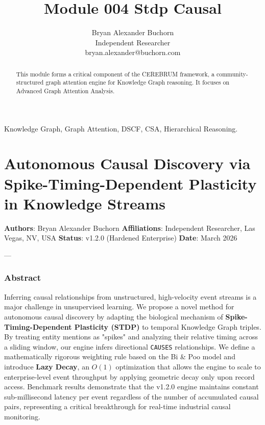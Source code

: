 \documentclass[10pt,journal,compsoc]{IEEEtran}
\begin{document}
\title{Module 004 Stdp Causal}
\author{Bryan Alexander Buchorn \\ Independent Researcher \\ bryan.alexander@buchorn.com}

\maketitle

\begin{abstract}
This module forms a critical component of the CEREBRUM framework, a community-structured graph attention engine for Knowledge Graph reasoning. It focuses on Advanced Graph Attention Analysis.
\end{abstract}

\begin{IEEEkeywords}
Knowledge Graph, Graph Attention, DSCF, CSA, Hierarchical Reasoning.
\end{IEEEkeywords}

\section{Autonomous Causal Discovery via Spike-Timing-Dependent Plasticity in Knowledge Streams}

\textbf{Authors}: Bryan Alexander Buchorn  
\textbf{Affili\-ations}: Independent Researcher, Las Vegas, NV, USA  
\textbf{Status}: v1.2.0 (Hardened Enterprise)  
\textbf{Date}: March 2026

---

\subsubsection{Abstract}
Inferring causal relat\-ionships from unstr\-uctured, high-velocity event streams is a major challenge in unsup\-ervised learning. We propose a novel method for autonomous causal discovery by adapting the biological mechanism of \textbf{Spike-Timing-Dependent Plasticity (STDP)} to temporal Knowledge Graph triples. By treating entity mentions as "spikes" and analyzing their relative timing across a sliding window, our engine infers directional \texttt{CAUSES} relat\-ionships. We define a mathe\-matically rigorous weighting rule based on the Bi \& Poo \cite{bipoo1998} model and introduce \textbf{Lazy Decay}, an $O(1)$ optim\-ization that allows the engine to scale to enterprise-level event throughput by applying geometric decay only upon record access. Benchmark results demonstrate that the v1.2.0 engine maintains constant sub-millisecond latency per event regardless of the number of accumulated causal pairs, repre\-senting a critical break\-through for real-time industrial causal monitoring.
\end{document}
